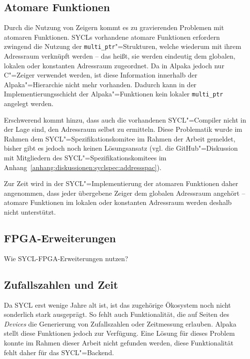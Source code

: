 \subsection{Atomare Funktionen}\label{implementierung:probleme:atomics}

Durch die Nutzung von Zeigern kommt es zu gravierenden Problemen mit atomaren
Funktionen. SYCLs vorhandene atomare Funktionen erfordern zwingend die Nutzung
der \texttt{multi\_ptr}"=Strukturen, welche wiederum mit ihrem Adressraum
verknüpft werden -- das heißt, sie werden eindeutig dem globalen, lokalen oder
konstanten Adressraum zugeordnet. Da in Alpaka jedoch nur C"=Zeiger
verwendet werden, ist diese Information innerhalb der Alpaka"=Hierarchie nicht
mehr vorhanden. Dadurch kann in der Implementierungsschicht der
Alpaka"=Funktionen kein lokaler \texttt{multi\_ptr} angelegt werden.

Erschwerend kommt hinzu, dass auch die vorhandenen SYCL"=Compiler nicht in der
Lage sind, den Adressraum selbst zu ermitteln. Diese Problematik wurde im Rahmen
dem SYCL"=Spezifikationskomitee im Rahmen der Arbeit gemeldet, bisher gibt es
jedoch noch keinen Lösungsansatz (vgl. die GitHub"=Diskussion mit Mitgliedern
des SYCL"=Spezifikationskomitees im
Anhang~\ref{anhang:diskussionen:syclspec:addressspac}).

Zur Zeit wird in der SYCL"=Implementierung der atomaren Funktionen daher
angenommen, dass jeder übergebene Zeiger dem globalen Adressraum angehört --
atomare Funktionen im lokalen oder konstanten Adressraum werden deshalb nicht
unterstützt.

\subsection{FPGA-Erweiterungen}\label{implementierung:probleme:fpga}

Wie SYCL-FPGA-Erweiterungen nutzen?

\subsection{Zufallszahlen und Zeit}

Da SYCL erst wenige Jahre alt ist, ist das zugehörige Ökosystem noch nicht
sonderlich stark ausgeprägt. So fehlt auch Funktionalität, die auf Seiten des
\textit{Devices} die Generierung von Zufallszahlen oder Zeitmessung erlauben.
Alpaka stellt diese Funktionen jedoch zur Verfügung. Eine Lösung für dieses
Problem konnte im Rahmen dieser Arbeit nicht gefunden werden, diese
Funktionalität fehlt daher für das SYCL"=Backend.
